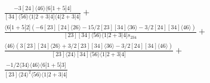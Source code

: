 \documentclass[varwidth, border=5pt]{standalone}
\begin{document}
\begin{my}
$\begin{gathered}
\scriptscriptstyle\frac{-3[24]⟨46⟩⟨6|1+5|4]}{[34]⟨56⟩⟨1|2+3|4]⟨4|2+3|4]}+\\
\scriptscriptstyle\frac{⟨6|1+5|2]\scriptscriptstyle(-6[23][24]⟨26⟩-15/2[23][34]⟨36⟩-3/2[24][34]⟨46⟩)}{[23][34]⟨56⟩⟨1|2+3|4]s_{234}}+\\
\scriptscriptstyle\frac{⟨46⟩\scriptscriptstyle(3[23][24]⟨26⟩+3/2[23][34]⟨36⟩-3/2[24][34]⟨46⟩)}{[23]⟨24⟩[34]⟨56⟩⟨1|2+3|4]}+\\
\scriptscriptstyle\frac{-1/2⟨34⟩⟨46⟩⟨6|1+5|3]}{[23]⟨24⟩^2⟨56⟩⟨1|2+3|4]}\phantom{+}
\end{gathered}$
\end{my}
\end{document}
